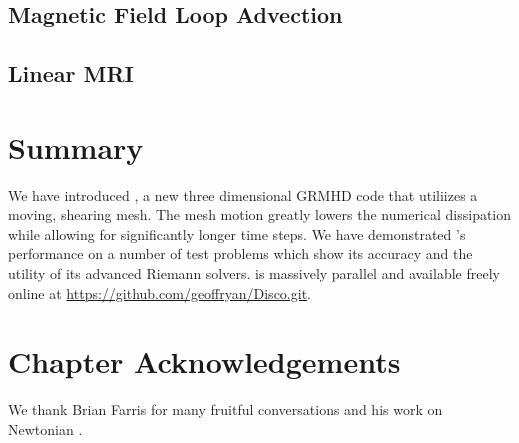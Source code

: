 \subsection{Magnetic Field Loop Advection}
\subsection{Linear MRI}


\section{Summary}

We have introduced \grdisco, a new three dimensional GRMHD code that utiliizes a moving, shearing mesh.  The mesh motion greatly lowers the numerical dissipation while allowing for significantly longer time steps.  We have demonstrated \grdisco's performance on a number of test problems which show its accuracy and the utility of its advanced Riemann solvers.  \grdisco is massively parallel and available freely online at \url{https://github.com/geoffryan/Disco.git}.

\section{Chapter Acknowledgements} 

We thank Brian Farris for many fruitful conversations and his work on Newtonian \disco.  

